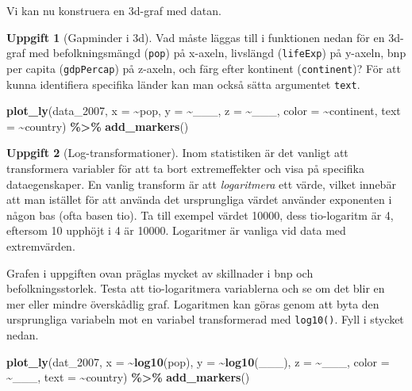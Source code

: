 \documentclass[
]{book}
\newenvironment{Shaded}{\begin{snugshade}}{\end{snugshade}}
\newcommand{\AttributeTok}[1]{\textcolor[rgb]{0.13,0.29,0.53}{#1}}
\newcommand{\FunctionTok}[1]{\textcolor[rgb]{0.13,0.29,0.53}{\textbf{#1}}}
\newcommand{\NormalTok}[1]{#1}
\newcommand{\SpecialCharTok}[1]{\textcolor[rgb]{0.81,0.36,0.00}{\textbf{#1}}}
\theoremstyle{definition}
\theoremstyle{definition}
\theoremstyle{definition}
\newtheorem{exercise}{Uppgift}[chapter]
\theoremstyle{definition}
\theoremstyle{remark}
\begin{document}
Vi kan nu konstruera en 3d-graf med datan.

\begin{exercise}[Gapminder i 3d]

Vad måste läggas till i funktionen nedan för en 3d-graf med befolkningsmängd (\texttt{pop}) på x-axeln, livslängd (\texttt{lifeExp}) på y-axeln, bnp per capita (\texttt{gdpPercap}) på z-axeln, och färg efter kontinent (\texttt{continent})? För att kunna identifiera specifika länder kan man också sätta argumentet \texttt{text}.

\begin{Shaded}
\begin{Highlighting}[]
\FunctionTok{plot\_ly}\NormalTok{(data\_2007, }\AttributeTok{x =} \SpecialCharTok{\textasciitilde{}}\NormalTok{pop, }\AttributeTok{y =} \SpecialCharTok{\textasciitilde{}}\NormalTok{\_\_\_, }\AttributeTok{z =} \SpecialCharTok{\textasciitilde{}}\NormalTok{\_\_\_, }
        \AttributeTok{color =} \SpecialCharTok{\textasciitilde{}}\NormalTok{continent, }\AttributeTok{text =} \SpecialCharTok{\textasciitilde{}}\NormalTok{country) }\SpecialCharTok{\%\textgreater{}\%} 
  \FunctionTok{add\_markers}\NormalTok{()}
\end{Highlighting}
\end{Shaded}

\end{exercise}

\begin{exercise}[Log-transformationer]

Inom statistiken är det vanligt att transformera variabler för att ta bort extremeffekter och visa på specifika dataegenskaper. En vanlig transform är att \emph{logaritmera} ett värde, vilket innebär att man istället för att använda det ursprungliga värdet använder exponenten i någon bas (ofta basen tio). Ta till exempel värdet 10000, dess tio-logaritm är 4, eftersom 10 upphöjt i 4 är 10000. Logaritmer är vanliga vid data med extremvärden.

Grafen i uppgiften ovan präglas mycket av skillnader i bnp och befolkningsstorlek. Testa att tio-logaritmera variablerna och se om det blir en mer eller mindre överskådlig graf. Logaritmen kan göras genom att byta den ursprungliga variabeln mot en variabel transformerad med \texttt{log10()}. Fyll i stycket nedan.

\begin{Shaded}
\begin{Highlighting}[]
\FunctionTok{plot\_ly}\NormalTok{(dat\_2007, }\AttributeTok{x =} \SpecialCharTok{\textasciitilde{}}\FunctionTok{log10}\NormalTok{(pop), }\AttributeTok{y =} \SpecialCharTok{\textasciitilde{}}\FunctionTok{log10}\NormalTok{(\_\_\_), }
        \AttributeTok{z =} \SpecialCharTok{\textasciitilde{}}\NormalTok{\_\_\_, }\AttributeTok{color =} \SpecialCharTok{\textasciitilde{}}\NormalTok{\_\_\_, }\AttributeTok{text =} \SpecialCharTok{\textasciitilde{}}\NormalTok{country) }\SpecialCharTok{\%\textgreater{}\%} 
  \FunctionTok{add\_markers}\NormalTok{()}
\end{Highlighting}
\end{Shaded}

\end{exercise}
\end{document}

